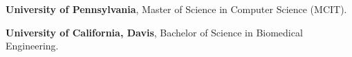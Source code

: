 %
%
%


\begin{scholarship}
					{\textbf{University of Pennsylvania}, Master of Science in Computer Science (MCIT).}
				
					{\textbf{University of California, Davis}, Bachelor of Science in Biomedical Engineering.} \\
	
\end{scholarship}